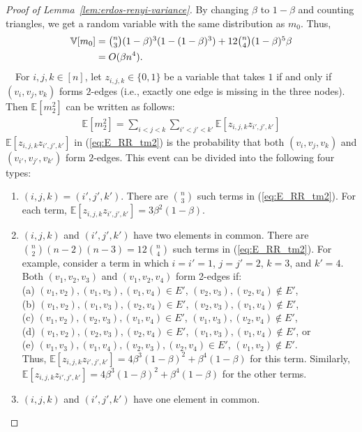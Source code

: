 {\begin{proof}[Proof of Lemma~\ref{lem:erdos-renyi-variance}]
By changing $\beta$ to $1-\beta$ and counting triangles, we get a random variable with the same distribution as $m_0$. Thus,
\begin{align*}
  \mathbb{V}[m_0] 
  &= \textstyle{\binom{n}{3} (1-\beta)^3(1-(1-\beta)^3) + 12\binom{n}{4} (1-\beta)^5\beta}
  \\
  &= O(\beta n^4).
\end{align*}
\smallskip
{}~~For $i,j,k \in [n]$, let $z_{i,j,k} \in \{0,1\}$ be a variable that takes $1$ if and only if 
$(v_i, v_j, v_k)$ forms $2$-edges (i.e., exactly one edge is missing in the three nodes). 
Then $\mathbb{E}[m_2^2]$ can be written as follows:
\begin{align}
  \mathbb{E}[m_2^2] = \sum_{i<j<k} \sum_{i'<j'<k'}
  \mathbb{E}[z_{i,j,k} z_{i',j',k'}] 
  \label{eq:E_RR_tm2}
\end{align}
$\mathbb{E}[z_{i,j,k} z_{i',j',k'}]$ in (\ref{eq:E_RR_tm2}) is the probability that both $(v_i,v_j,v_k)$ and $(v_{i'},v_{j'},v_{k'})$ form $2$-edges. 
This event can be divided into the following four types:
\begin{enumerate}
	\item $(i,j,k)=(i',j',k')$. There are $\binom{n}{3}$ such terms in (\ref{eq:E_RR_tm2}). 
    For each term, $\mathbb{E}[z_{i,j,k} z_{i',j',k'}]=3\beta^2(1-\beta)$. 
	\item $(i,j,k)$ and $(i',j',k')$ have two elements in common. 
	There are $\binom{n}{2}(n-2)(n-3) = 12 \binom{n}{4}$ such terms in (\ref{eq:E_RR_tm2}). 
	For example, consider a term in which $i=i'=1$, $j=j'=2$, $k=3$, and $k'=4$. 
	Both $(v_1,v_2,v_3)$ and $(v_1,v_2,v_4)$ form 2-edges if:\\
	(a) $(v_1,v_2), (v_1,v_3), (v_1,v_4) \in E'$, $(v_2,v_3), (v_2,v_4) \notin E'$, \\
	(b) $(v_1,v_2), (v_1,v_3), (v_2,v_4) \in E'$, $(v_2,v_3), (v_1,v_4) \notin E'$, \\
	(c) $(v_1,v_2), (v_2,v_3), (v_1,v_4) \in E'$, $(v_1,v_3), (v_2,v_4) \notin E'$, \\
	(d) $(v_1,v_2), (v_2,v_3), (v_2,v_4) \in E'$, $(v_1,v_3), (v_1,v_4) \notin E'$, or \\
	(e) $(v_1,v_3), (v_1,v_4), (v_2,v_3), (v_2,v_4) \in E'$, $(v_1,v_2) \notin E'$. \\
    Thus, $\mathbb{E}[z_{i,j,k} z_{i',j',k'}]=4\beta^3(1-\beta)^2 + \beta^4(1-\beta)$ for this term. 
    Similarly, $\mathbb{E}[z_{i,j,k} z_{i',j',k'}]=4\beta^3(1-\beta)^2 + \beta^4(1-\beta)$ for the other terms.
	\item $(i,j,k)$ and $(i',j',k')$ have one element in common. 

\end{enumerate}
\end{proof}}
